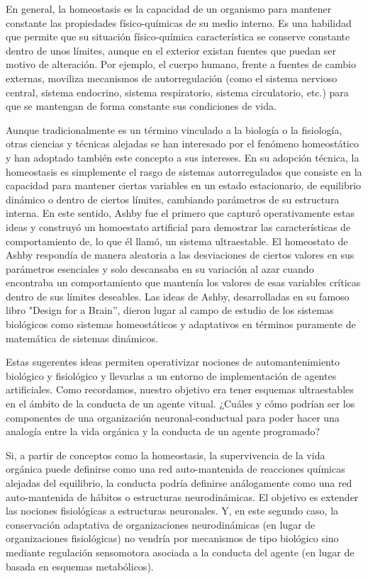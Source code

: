 En general, la homeostasis es la capacidad de un organismo para mantener constante las propiedades físico-químicas de su medio interno. Es una habilidad que permite que su situación físico-química característica se conserve constante dentro de unos límites, aunque en el exterior existan fuentes que puedan ser motivo de alteración. Por ejemplo, el cuerpo humano, frente a fuentes de cambio externas, moviliza mecanismos de autorregulación (como el sistema nervioso central, sistema endocrino, sistema respiratorio, sistema circulatorio, etc.) para que se mantengan de forma constante sus condiciones de vida.

Aunque tradicionalmente es un término vinculado a la biología o la fisiología, otras ciencias y técnicas alejadas se han interesado por el fenómeno homeostático y han adoptado también este concepto a sus intereses. En su adopción técnica, la homeostasis es simplemente el rasgo de sistemas autorregulados que consiste en la capacidad para mantener ciertas variables en un estado estacionario, de equilibrio dinámico o dentro de ciertos límites, cambiando parámetros de su estructura interna. En este sentido, Ashby fue el primero que capturó operativamente estas ideas y construyó un homoestato artificial para demostrar las características de comportamiento de, lo que él llamó, un sistema ultraestable. El homeostato de Ashby respondía de manera aleatoria a las desviaciones de ciertos valores en sus parámetros esenciales y solo descansaba en su variación al azar cuando encontraba un comportamiento que mantenía los valores de esas variables críticas dentro de sus límites deseables. Las ideas de Ashby, desarrolladas en su famoso libro "Design for a Brain”, dieron lugar al campo de estudio de los sistemas biológicos como sistemas homeostáticos y adaptativos en términos puramente de matemática de sistemas dinámicos.

Estas sugerentes ideas permiten operativizar nociones de automantenimiento biológico y fisiológico y llevarlas a un entorno de implementación de agentes artificiales. Como recordamos, nuestro objetivo era tener esquemas ultraestables en el ámbito de la conducta de un agente vitual. ¿Cuáles y cómo podrían ser los componentes de una organización neuronal-conductual para poder hacer una analogía entre la vida orgánica y la conducta de un agente programado?

Si, a partir de conceptos como la homeostasis, la supervivencia de la vida orgánica puede definirse como una red auto-mantenida de reacciones químicas alejadas del equilibrio, la conducta podría definirse análogamente como una red auto-mantenida de hábitos o estructuras neurodinámicas. El objetivo es extender las nociones fisiológicas a estructuras neuronales. Y, en este segundo caso, la conservación adaptativa de organizaciones neurodinámicas (en lugar de organizaciones fisiológicas) no vendría por mecanismos de tipo biológico sino mediante regulación sensomotora asociada a la conducta del agente (en lugar de basada en esquemas metabólicos).

